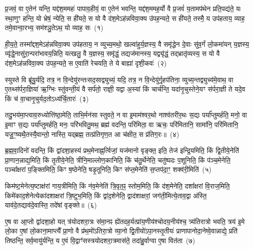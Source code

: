 \setcounter{anuvakam}{0}
प्र॒जवं॒ वा ए॒तेन॑ यन्ति॒ यद्द॑श॒ममहः॑ पापाव॒हीयं॒ वा ए॒तेन॑ भवन्ति॒ यद्द॑श॒ममह॒र्यो वै प्र॒जवं॑ य॒तामप॑थेन प्रति॒पद्य॑ते॒ यः स्था॒णुꣳ हन्ति॒ यो भ्रेषं॒ न्येति॒ स ही॑यते॒ स यो वै द॑श॒मे\-ऽह॑न्नविवा॒क्य उ॑पह॒न्यते॒ स ही॑यते॒ तस्मै॒ य उप॑हताय॒ व्याह॒ तमे॒वान्वा॒रभ्य॒ सम॑श्ञु॒ते\-ऽथ॒ यो व्याह॒ सः~(१)\ip

ही॒य॒ते॒ तस्मा᳚द्\-दश॒मे\-ऽह॑न्नविवा॒क्य उप॑हताय॒ न व्युच्य॒मथो॒ खल्वा॑हुर्य॒ज्ञस्य॒ वै समृ॑द्धेन दे॒वाः सु॑व॒र्गं लो॒कमा॑यन् य॒ज्ञस्य॒ व्यृ॑द्धे॒नासु॑रा॒न्परा॑भावय॒न्निति॒ यत्खलु॒ वै य॒ज्ञस्य॒ समृ॑द्धं॒ तद्यज॑मानस्य॒ यद्व्यृ॑द्धं॒ तद्भ्रातृ॑व्यस्य॒ स यो वै द॑श॒मे\-ऽह॑न्नविवा॒क्य उ॑पह॒न्यते॒ स ए॒वाति॑ रेचयति॒ ते ये बाह्या॑ दृशी॒कवः॑~(२)\ip

स्युस्ते वि ब्रू॑यु॒र्यदि॒ तत्र॒ न वि॒न्देयु॑रन्तःसद॒साद्व्युच्यं॒ यदि॒ तत्र॒ न वि॒न्देयु॑र्गृ॒हप॑तिना॒ व्युच्य॒न्तद्व्युच्य॑मे॒वाथ॒ वा ए॒तथ्स॑र्परा॒ज्ञिया॑ ऋ॒ग्भिः स्तु॑वन्ती॒यं वै सर्प॑तो॒ राज्ञी॒ यद्वा अ॒स्यां किं चार्च॑न्ति॒ यदा॑नृ॒चुस्तेने॒यꣳ स॑र्परा॒ज्ञी ते यदे॒व किं च॑ वा॒चानृ॒चुर्यद॒तो\-ऽध्य॑र्चि॒तारः॑~(३)\ip

तदु॒भय॑मा॒प्त्वाव॒रुध्योत्ति॑ष्ठा॒मेति॒ ताभि॒र्मन॑सा स्तुवते॒ न वा इ॒माम॑श्वर॒थो नाश्व॑तरीर॒थः स॒द्यः पर्या᳚प्तुमर्\mbox{}हति॒ मनो॒ वा इ॒माꣳ स॒द्यः पर्या᳚प्तुमर्\mbox{}हति॒ मनः॒ परि॑भवितु॒मथ॒ ब्रह्म॑ वदन्ति॒ परि॑मिता॒ वा ऋचः॒ परि॑मितानि॒ सामा॑नि॒ परि॑मितानि॒ यजू॒ꣳ॒ष्यथै॒तस्यै॒वान्तो॒ नास्ति॒ यद्ब्रह्म॒ तत्प्र॑तिगृण॒त आ च॑क्षीत॒ स प्र॑तिग॒रः॥~(४)\ip

{\anuvakamend[{व्याह॒ स दृ॑शी॒कवो᳚\-ऽर्चि॒तारः॒ स एक॑ञ्च}]}

ब्र॒ह्म॒वा॒दिनो॑ वदन्ति॒ किं द्वा॑दशा॒हस्य॑ प्रथ॒मेनाह्न॒र्त्विजां॒ यज॑मानो वृङ्क्त॒ इति॒ तेज॑ इन्द्रि॒यमिति॒ किं द्वि॒तीये॒नेति॑ प्रा॒णान॒न्नाद्य॒मिति॒ किं तृ॒तीये॒नेति॒ त्रीनि॒माल्लोण॒कानिति॒ किं च॑तु॒र्थेनेति॒ चतु॑ष्पदः प॒शूनिति॒ किं प॑ञ्च॒मेनेति॒ पञ्चा᳚क्षरां प॒ङ्क्तिमिति॒ किꣳ ष॒ष्ठेनेति॒ षडृ॒तूनिति॒ किꣳ स॑प्त॒मेनेति॑ स॒प्तप॑दा॒ꣳ॒ शक्व॑री॒मिति॑~(५)\ip

किम॑ष्ट॒मेनेत्य॒ष्टाक्ष॑रां गाय॒त्रीमिति॒ किं न॑व॒मेनेति॑ त्रि॒वृत॒ꣴ॒ स्तोम॒मिति॒ किं द॑श॒मेनेति॒ दशा᳚क्षरां वि॒राज॒मिति॒ किमे॑काद॒शेनेत्येका॑\-दशाक्षरां त्रि॒ष्टुभ॒मिति॒ किं द्वा॑द॒शेनेति॒ द्वाद॑शाक्षरां॒ जग॑ती॒मित्ये॒ताव॒द्वा अ॑स्ति॒ याव॑दे॒तद्याव॑दे॒वास्ति॒ तदे॑षां वृङ्क्ते॥~(६)\ip

{\anuvakamend[{शक्व॑री॒मित्येक॑चत्वारिꣳशच्च}]}

ए॒ष वा आ॒प्तो द्वा॑दशा॒हो यत् त्र॑योदशरा॒त्रः स॑मा॒नꣴ ह्ये॑तदह॒र्यत्प्रा॑य॒णीय॑श्चोदय॒नीय॑श्च॒ त्र्य॑तिरात्रो भवति॒ त्रय॑ इ॒मे लो॒का ए॒षां लो॒काना॒माप्त्यै᳚ प्रा॒णो वै प्र॑थ॒मो॑\-ऽतिरा॒त्रो व्या॒नो द्वि॒तीयो॑\-ऽपा॒नस्तृ॒तीयः॑ प्राणापानोदा॒नेष्वे॒वान्नाद्ये॒ प्रति॑ तिष्ठन्ति॒ सर्व॒मायु॑र्यन्ति॒ य ए॒वं वि॒द्वाꣳ॑सस्त्रयोदशरा॒त्रमास॑ते॒ तदा॑हु॒र्वाग्वा ए॒षा वित॑ता~(७)\ip


